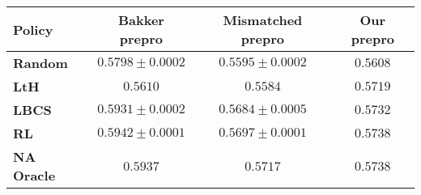 \begin{tabular}{lccc}
\toprule
\textbf{Policy}& Bakker prepro  & Mismatched prepro & Our prepro\\
\midrule
\textbf{Random} & $0.5798\pm 0.0002$ &  $0.5595\pm 0.0002$ & $0.5608$\\
\textbf{LtH} & $0.5610$ & $0.5584$ & $0.5719$\\
\textbf{LBCS} & $0.5931 \pm 0.0002$ & $0.5684 \pm 0.0005$ & $0.5732$\\
\textbf{RL} & $\mathbf{0.5942\pm 0.0001}$& $\mathbf{0.5697 \pm 0.0001}$ &$\mathbf{0.5738}$\\
\midrule
\textbf{NA Oracle} & $0.5937$ & $0.5717$& $0.5738$\\
\bottomrule
\end{tabular}
      